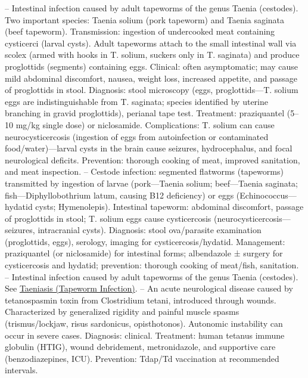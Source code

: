 -- Intestinal infection caused by adult tapeworms of the genus Taenia (cestodes). Two important species: Taenia solium (pork tapeworm) and Taenia saginata (beef tapeworm). Transmission: ingestion of undercooked meat containing cysticerci (larval cysts). Adult tapeworms attach to the small intestinal wall via scolex (armed with hooks in T. solium, suckers only in T. saginata) and produce proglottids (segments) containing eggs. Clinical: often asymptomatic; may cause mild abdominal discomfort, nausea, weight loss, increased appetite, and passage of proglottids in stool. Diagnosis: stool microscopy (eggs, proglottids—T. solium eggs are indistinguishable from T. saginata; species identified by uterine branching in gravid proglottids), perianal tape test. Treatment: praziquantel (5--10 mg/kg single dose) or niclosamide. Complications: T. solium can cause neurocysticercosis (ingestion of eggs from autoinfection or contaminated food/water)—larval cysts in the brain cause seizures, hydrocephalus, and focal neurological deficits. Prevention: thorough cooking of meat, improved sanitation, and meat inspection.
-- Cestode infection: segmented flatworms (tapeworms) transmitted by ingestion of larvae (pork—Taenia solium; beef—Taenia saginata; fish—Diphyllobothrium latum, causing B12 deficiency) or eggs (Echinococcus—hydatid cysts; Hymenolepis). Intestinal tapeworm: abdominal discomfort, passage of proglottids in stool; T. solium eggs cause cysticercosis (neurocysticercosis—seizures, intracranial cysts). Diagnosis: stool ova/parasite examination (proglottids, eggs), serology, imaging for cysticercosis/hydatid. Management: praziquantel (or niclosamide) for intestinal forms; albendazole ± surgery for cysticercosis and hydatid; prevention: thorough cooking of meat/fish, sanitation.
-- Intestinal infection caused by adult tapeworms of the genus Taenia (cestodes). See \hyperlink{Taeniasis (Tapeworm Infection)}{Taeniasis (Tapeworm Infection)}.
-- An acute neurological disease caused by tetanospasmin toxin from Clostridium tetani, introduced through wounds. Characterized by generalized rigidity and painful muscle spasms (trismus/lockjaw, risus sardonicus, opisthotonos). Autonomic instability can occur in severe cases. Diagnosis: clinical. Treatment: human tetanus immune globulin (HTIG), wound debridement, metronidazole, and supportive care (benzodiazepines, ICU). Prevention: Tdap/Td vaccination at recommended intervals.
